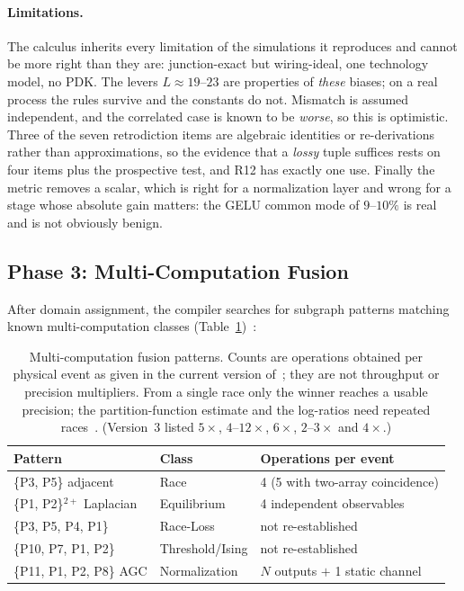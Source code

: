 \documentclass[11pt]{article}
\begin{document}
\paragraph{Limitations.} The calculus inherits every limitation of the simulations it reproduces and cannot be more right than they are: junction-exact but wiring-ideal, one technology model, no PDK. The levers $L\approx19$--$23$ are properties of \textit{these} biases; on a real process the rules survive and the constants do not. Mismatch is assumed independent, and the correlated case is known to be \textit{worse}, so this is optimistic. Three of the seven retrodiction items are algebraic identities or re-derivations rather than approximations, so the evidence that a \textit{lossy} tuple suffices rests on four items plus the prospective test, and R12 has exactly one use. Finally the metric removes a scalar, which is right for a normalization layer and wrong for a stage whose absolute gain matters: the GELU common mode of $9$--$10\%$ is real and is not obviously benign.

\subsection{Phase 3: Multi-Computation Fusion}

After domain assignment, the compiler searches for subgraph patterns matching known multi-computation classes (Table~\ref{tab:fusion})~\cite{bieg2026}:

\begin{table}[h]
\centering
\caption{Multi-computation fusion patterns. Counts are operations obtained per physical event as given in the current version of~\cite{bieg2026}; they are not throughput or precision multipliers. From a single race only the winner reaches a usable precision; the partition-function estimate and the log-ratios need repeated races~\cite{bieg2026}. (Version~3 listed $5\times$, $4$--$12\times$, $6\times$, $2$--$3\times$ and $4\times$.)}
\label{tab:fusion}
\small
\begin{tabular}{lll}
\toprule
Pattern & Class & Operations per event \\
\midrule
\{P3, P5\} adjacent & Race & 4 (5 with two-array coincidence) \\
\{P1, P2\}$^{2+}$ Laplacian & Equilibrium & 4 independent observables \\
\{P3, P5, P4, P1\} & Race-Loss & not re-established \\
\{P10, P7, P1, P2\} & Threshold/Ising & not re-established \\
\{P11, P1, P2, P8\} AGC & Normalization & $N$ outputs $+$ 1 static channel \\
\bottomrule
\end{tabular}
\end{table}
\end{document}
